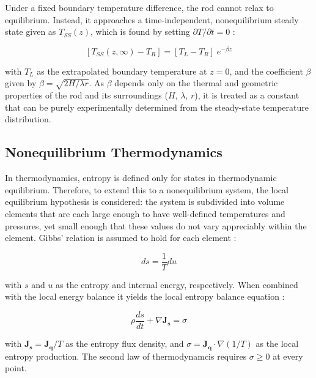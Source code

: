 \documentclass[11pt, a4paper, twocolumn]{article}
\begin{document}
Under a fixed boundary temperature difference, the rod cannot relax to equilibrium. Instead, it approaches a time-independent, nonequilibrium steady state given as $T_{SS}(z)$, which is found by setting $\partial T/\partial t = 0$ \cite{rafols1992heat}:

\vspace{-3ex}
\begin{equation}\label{eq:4}
  [T_{SS}(z, \infty)-T_R] = [T_L-T_R]\; e^{-\beta z}
\end{equation}

with $T_L$ as the extrapolated boundary temperature at $z=0$, and the coefficient $\beta$ given by $\beta=\sqrt{2H/\lambda r}$. As $\beta$ depends only on the thermal and geometric properties of the rod and its surroundings ($H$, $\lambda$, $r$), it is treated as a constant that can be purely experimentally determined from the steady-state temperature distribution. \cite{diaz1990heat,rafols1992heat}

\subsection{Nonequilibrium Thermodynamics} \label{sec:1.2}

In thermodynamics, entropy is defined only for states in thermodynamic equilibrium. Therefore, to extend this to a nonequilibrium system, the local equilibrium hypothesis is considered: the system is subdivided into volume elements that are each large enough to have well-defined temperatures and pressures, yet small enough that these values do not vary appreciably within the element. Gibbs' relation is assumed to hold for each element \cite{rafols1992heat}:

\vspace{-3ex}
\begin{equation}\label{eq:5}
  ds=\frac{1}{T}du
\end{equation}

with $s$ and $u$ as the entropy and internal energy, respectively. When combined with the local energy balance it yields the local entropy balance equation \cite{lurie1980concepts,rafols1992heat}:

\vspace{-3ex}
\begin{equation} \label{eq:6}
  \rho \frac{ds}{dt} + \nabla \mathbf{J_s} = \sigma
\end{equation}

with $\mathbf{J_s} = \mathbf{J_q}/T$ as the entropy flux density, and $\sigma =\mathbf{J_q} \cdot \nabla (1/T)$ as the local entropy production. The second law of thermodynamcis requires $\sigma \ge 0$ at every point. \cite{lurie1980concepts,rafols1992heat}
\end{document}
